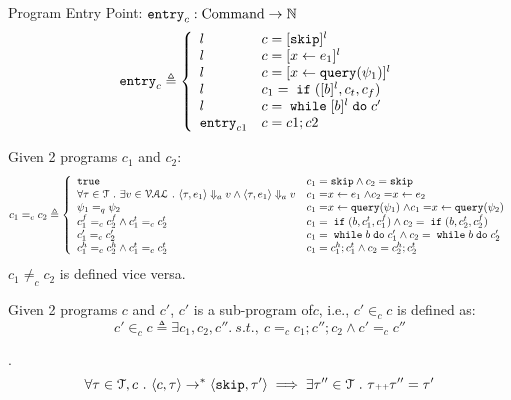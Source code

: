 %
%
%
%
%
Program Entry Point: $\mathtt{entry}_c : \mbox{Command} \to \mathbb{N}$ 
\[
  \entry_c \triangleq 
\left\{
  \begin{array}{ll} 
     l       
    & c = [\eskip]{}^l
    \\ 
    l    & c = [\assign{x}{\expr_1}]{}^l
    \\ 
    l      
    & c = [\assign{x}{\query(\qexpr_1)}]{}^l
    \\
   l
    & c_1 = \eif([b]{}^l, c_t, c_f)
    \\ 
    l         
    & c = \ewhile [b]^l \edo c'
    \\ 
    \entry_{c1}
    & c = c1;c2
  \end{array}
  \right.
\]
%
\begin{defn}
%
\label{def:aq_prog}
Given 2 programs $c_1$ and $c_2$:
\[
c_1 =_{c} c_2
\triangleq 
\left\{
  \begin{array}{ll} 
    \etrue        
    & c_1 = \eskip \land c_2 = \eskip
    \\ 
    \forall \trace \in \mathcal{T} \st \exists v \in \mathcal{VAL}
    \st \config{ \trace, \expr_1} \aarrow v \land \config{ \trace, \expr_1} \aarrow v     
    & c_1 = \assign{x}{\expr_1} \land c_2 = \assign{x}{\expr_2} 
    \\ 
    \qexpr_1 =_{q} \qexpr_2       
    & c_1 = \assign{x}{\query(\qexpr_1)} \land c_1 = \assign{x}{\query(\qexpr_2)} 
    \\
    c_1^f =_{c} c_2^f \land c_1^t =_{c} c_2^t
    & c_1 = \eif(b, c_1^t, c_1^f) \land c_2 = \eif(b, c_2^t, c_2^f)
    \\ 
    c_1' =_{c} c_2'         
    & c_1 = \ewhile b \edo c_1' \land c_2 = \ewhile b \edo c_2'
    \\ 
    c_1^h =_{c} c_2^h \land c_1^t =_{c} c_2^t
    & c_1 = c_1^h;c_1^t \land c_2 = c_2^h;c_2^t 
  \end{array}
  \right.
\]
%
$c_1 \neq_{c} c_2$  is defined vice versa.
%
\end{defn}
%
Given 2 programs $c$ and $c'$, $c'$ is a sub-program of$c$, i.e., $c' \in_{c} c$ is defined as:
\begin{equation}
c' \in_{c} c \triangleq \exists c_1, c_2, c''. ~ s.t.,~
c =_{c} c_1; c''; c_2 \land c' =_{c} c''
\end{equation} 
%
\begin{lem}
.
\\
$$
\forall \mathtt{\tau} \in \mathcal{T}, c ~.~
\langle c, \mathtt{\tau} \rangle \rightarrow^{*} \langle \mathtt{skip}, \mathtt{\tau}' \rangle 
\implies \exists \mathtt{\tau}'' \in \mathcal{T} ~.~ \mathtt{\tau} {\scriptscriptstyle ++} \mathtt{\tau}'' = \mathtt{\tau}'
$$
\end{lem}
